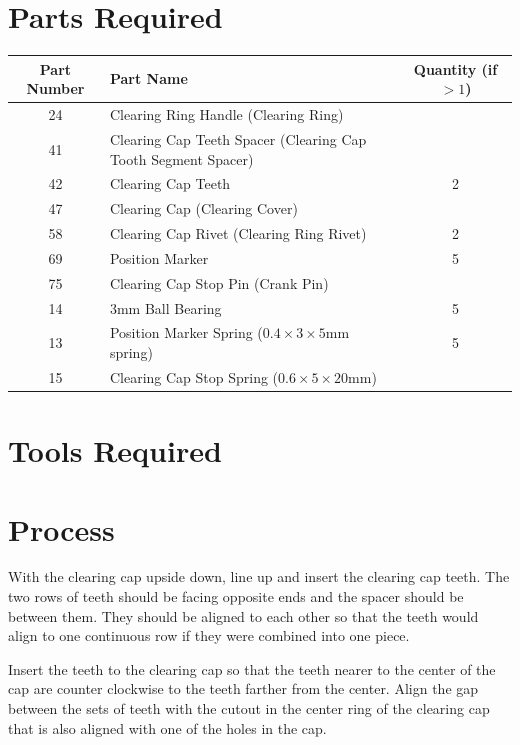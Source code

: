 \documentclass[openany]{book}
\begin{document}
\section{Parts Required}
\begin{table}[!ht]
	\centering
	\begin{tabular}{clc}
		Part Number & Part Name & Quantity (if $>1$) \\ \hline
		24 & Clearing Ring Handle (Clearing Ring) & \\
		41 & Clearing Cap Teeth Spacer (Clearing Cap Tooth Segment Spacer) & \\
		42 & Clearing Cap Teeth & 2 \\
		47 & Clearing Cap (Clearing Cover) & \\
		58 & Clearing Cap Rivet (Clearing Ring Rivet) & 2 \\
		69 & Position Marker & 5 \\
		75 & Clearing Cap Stop Pin (Crank Pin) & \\ \hline \hline
		14 & 3mm Ball Bearing & 5 \\
		13 & Position Marker Spring ($0.4\times3\times5$mm spring) & 5 \\
		15 & Clearing Cap Stop Spring ($0.6\times5\times20$mm) &
	\end{tabular}
\end{table}

\section{Tools Required}

\section{Process}
With the clearing cap upside down, line up and insert the clearing cap teeth. The two rows of teeth should be facing opposite ends and the spacer should be between them. They should be aligned to each other so that the teeth would align to one continuous row if they were combined into one piece.



Insert the teeth to the clearing cap so that the teeth nearer to the center of the cap are counter clockwise to the teeth farther from the center. Align the gap between the sets of teeth with the cutout in the center ring of the clearing cap that is also aligned with one of the holes in the cap.
\end{document}
